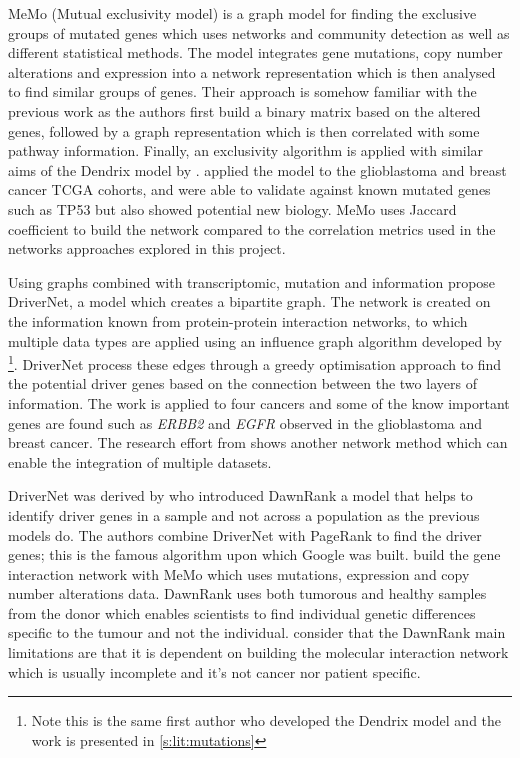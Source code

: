 MeMo (Mutual exclusivity model)\cite{Ciriello2012-hi} is a graph model for finding the exclusive groups of mutated genes which uses networks and community detection as well as different statistical methods. The model integrates gene mutations, copy number alterations and expression into a network representation which is then analysed to find similar groups of genes. Their approach is somehow familiar with the previous work as the authors first build a binary matrix based on the altered genes, followed by a graph representation which is then correlated with some pathway information. Finally, an exclusivity algorithm is applied with similar aims of the Dendrix model by \citet{Vandin2012-cf}. \citet{Ciriello2012-hi} applied the model to the glioblastoma and breast cancer TCGA cohorts, and were able to validate against known mutated genes such as TP53 but also showed potential new biology. MeMo uses Jaccard coefficient to build the network compared to the correlation metrics used in the networks approaches explored in this project. 

Using graphs combined with transcriptomic, mutation and information \citet{Bashashati2012-lk} propose DriverNet, a model which creates a bipartite graph. The network is created on the information known from protein-protein interaction networks, to which multiple data types are applied using an influence graph algorithm developed by \citet{Vandin2011-bs}\footnote{Note this is the same first author who developed the Dendrix model and the work is presented in \cref{s:lit:mutations}}. DriverNet process these edges through a greedy optimisation approach to find the potential driver genes based on the connection between the two layers of information. The work is applied to four cancers and some of the know important genes are found such as \textit{ERBB2} and \textit{EGFR} observed in the glioblastoma and breast cancer. The research effort from \citet{Bashashati2012-lk} shows another network method which can enable the integration of multiple datasets.

DriverNet was derived by \citet{Hou2014-se} who introduced DawnRank a model that helps to identify driver genes in a sample and not across a population as the previous models do. The authors combine DriverNet with PageRank to find the driver genes; this is the famous algorithm upon which Google was built. \citet{Hou2014-se} build the gene interaction network with MeMo \cite{Ciriello2012-hi} which uses mutations, expression and copy number alterations data. DawnRank uses both tumorous and healthy samples from the donor which enables scientists to find individual genetic differences specific to the tumour and not the individual. \citet{Hou2014-se} consider that the DawnRank main limitations are that it is dependent on building the molecular interaction network which is usually incomplete and it's not cancer nor patient specific. 



